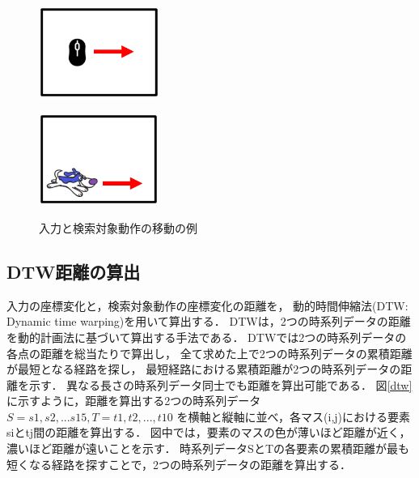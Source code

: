 \documentclass[11pt]{jreport}
\begin{document}
\begin{figure}[H]
    \centering
    \begin{minipage}{0.45\linewidth}
        \centering
        \includegraphics[height=3cm]{catmove.eps}
        \label{catmove}
    \end{minipage}
    \hspace{0.04\columnwidth}
    \begin{minipage}{0.45\linewidth}
        \centering
        \includegraphics[height=3cm]{dogmove.eps}
        \label{dogmove}
    \end{minipage}
    \hspace{0.04\columnwidth}
    \caption{入力と検索対象動作の移動の例}
    \label{moveexample}
\end{figure}

\subsection{DTW距離の算出}
入力の座標変化と，検索対象動作の座標変化の距離を，
動的時間伸縮法(DTW: Dynamic time warping)を用いて算出する．
DTWは，2つの時系列データの距離を動的計画法に基づいて算出する手法である．
DTWでは2つの時系列データの各点の距離を総当たりで算出し，
全て求めた上で2つの時系列データの累積距離が最短となる経路を探し，
最短経路における累積距離が2つの時系列データの距離を示す．
異なる長さの時系列データ同士でも距離を算出可能である．
図\ref{dtw}に示すように，距離を算出する2つの時系列データ$S=s1,s2,...s15,T=t1,t2,...,t10$
を横軸と縦軸に並べ，各マス(i,j)における要素siとtj間の距離を算出する．
図中では，要素のマスの色が薄いほど距離が近く，濃いほど距離が遠いことを示す．
時系列データSとTの各要素の累積距離が最も短くなる経路を探すことで，2つの時系列データの距離を算出する．
\end{document}
